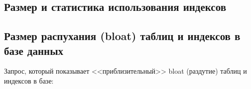 



\subsection{Размер и статистика использования индексов}





\subsection{Размер распухания (bloat) таблиц и индексов в базе данных}
\label{sec:snippets-bloating}

Запрос, который показывает <<приблизительный>> bloat (раздутие) таблиц и индексов в базе:


